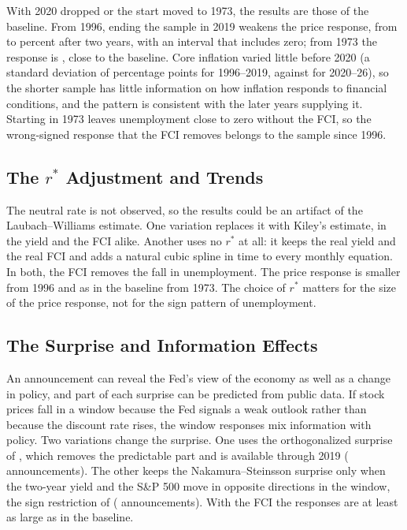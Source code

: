 \documentclass[11pt]{article}
\newcommand{\rs}{r^{*}}
\begin{document}
With 2020 dropped or the start moved to 1973, the results are those of the baseline. From 1996, ending the sample in 2019 weakens the price response, from  to  percent after two years, with an interval that includes zero; from 1973 the response is , close to the baseline. Core inflation varied little before 2020 (a standard deviation of  percentage points for 1996--2019, against  for 2020--26), so the shorter sample has little information on how inflation responds to financial conditions, and the pattern is consistent with the later years supplying it. Starting in 1973 leaves unemployment close to zero without the FCI, so the wrong-signed response that the FCI removes belongs to the sample since 1996.

\subsection{The $r^*$ Adjustment and Trends}\label{sec:rstarrob}
The neutral rate is not observed, so the results could be an artifact of the Laubach--Williams estimate. One variation replaces it with Kiley's estimate, in the yield and the FCI alike. Another uses no $\rs$ at all: it keeps the real yield and the real FCI and adds a natural cubic spline in time to every monthly equation. In both, the FCI removes the fall in unemployment. The price response is smaller from 1996 and as in the baseline from 1973. The choice of $\rs$ matters for the size of the price response, not for the sign pattern of unemployment.

\subsection{The Surprise and Information Effects}\label{sec:surprise}
An announcement can reveal the Fed's view of the economy as well as a change in policy, and part of each surprise can be predicted from public data. If stock prices fall in a window because the Fed signals a weak outlook rather than because the discount rate rises, the window responses mix information with policy. Two variations change the surprise. One uses the orthogonalized surprise of \citet{bauer2023}, which removes the predictable part and is available through 2019 ( announcements). The other keeps the Nakamura--Steinsson surprise only when the two-year yield and the S\&P 500 move in opposite directions in the window, the sign restriction of \citet{jarocinski2020} ( announcements). With the FCI the responses are at least as large as in the baseline.
\end{document}
